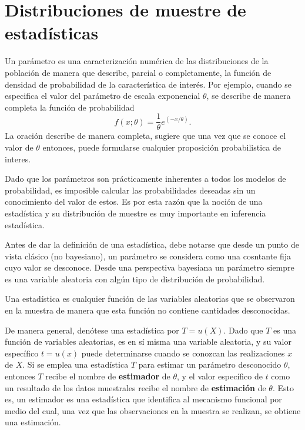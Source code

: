 \setcounter{section}{2}
\section{Distribuciones de muestre de estadísticas}


\begin{def.}
    Un parámetro es una caracterización numérica de las distribuciones de la población de manera que describe, parcial o completamente, la función de densidad de probabilidad de la característica de interés. Por ejemplo, cuando se especifica el valor del parámetro de escala exponencial $\theta$, se describe de manera completa la función de probabilidad
    $$f(x;\theta)=\dfrac{1}{\theta}e^{(-x/\theta)}.$$
    La oración describe de manera completa, sugiere que una vez que se conoce el valor de $\theta$ entonces, puede formularse cualquier proposición probabilistica de interes.
\end{def.}

Dado que los parámetros son prácticamente inherentes a todos los modelos de probabilidad, es imposible calcular las probabilidades deseadas sin un conocimiento del valor de estos. Es por esta razón que la noción de una estadística y su distribución de muestre es muy importante en inferencia estadística.

Antes de dar la definición de una estadística, debe notarse que desde un punto de vista clásico (no bayesiano), un parámetro se considera como una cosntante fija cuyo valor se desconoce. Desde una perspectiva bayesiana un parámetro siempre es una variable aleatoria con algún tipo de distribución de probabilidad.

\begin{def.}
    Una estadística es cualquier función de las variables aleatorias que se observaron en la muestra de manera que esta función no contiene cantidades desconocidas.
\end{def.}

De manera general, denótese una estadística por $T=u(X)$. Dado que $T$ es una función de variables aleatorias, es en sí misma una variable aleatoria, y su valor específico $t=u(x)$ puede determinarse cuando se conozcan las realizaciones $x$ de $X$. Si se emplea una estadística $T$ para estimar un parámetro desconocido $\theta$, entonces $T$ recibe el nombre de \textbf{estimador} de $\theta$, y el valor específico de $t$ como un resultado de los datos muestrales recibe el nombre de \textbf{estimación} de $\theta$. Esto es, un estimador es una estadística que identifica al mecanismo funcional por medio del cual, una vez que las observaciones en la muestra se realizan, se obtiene una estimación.\\

